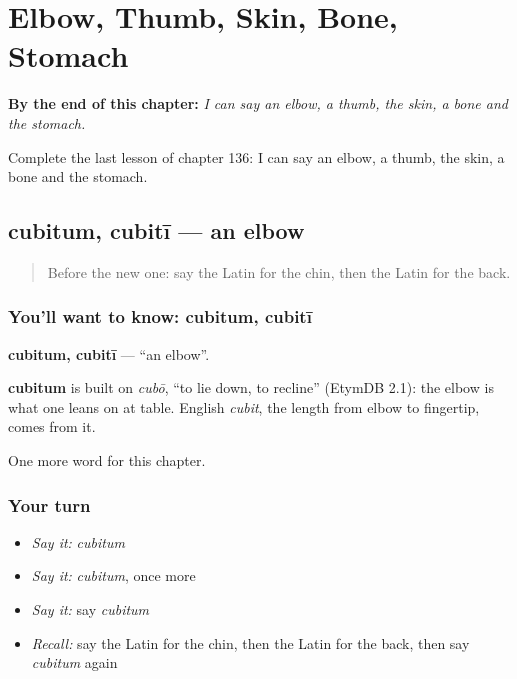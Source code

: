 
\chapter{Elbow, Thumb, Skin, Bone, Stomach}
\label{ch:la-elbow-thumb-skin-bone-stomach}

\begin{chapteropening}
\textbf{By the end of this chapter:} \emph{I can say an elbow, a thumb, the skin, a bone and the stomach.}

Complete the last lesson of chapter 136: I can say an elbow, a thumb, the skin, a bone and the stomach.
\end{chapteropening}

\section[cubitum, cubitī]{cubitum, cubitī — an elbow}

\label{lesson:LA-C136-cubitum}



\begin{quote}
Before the new one: say the Latin for the chin, then the Latin for the back.
\end{quote}

\subsection*{You'll want to know: cubitum, cubitī}
\textbf{cubitum, cubitī} — \textquotedblleft{}an elbow\textquotedblright{}.

\begin{cousinweb}
\textbf{cubitum} is built on \emph{cubō}, \textquotedblleft{}to lie down, to recline\textquotedblright{} (EtymDB 2.1): the elbow is what one leans on at table. English \emph{cubit}, the length from elbow to fingertip, comes from it.
\end{cousinweb}

\begin{grammarlens}[title={What you've built}]
One more word for this chapter.
\end{grammarlens}

\subsection*{Your turn}
\begin{itemize}
\raggedright
  \item \emph{Say it:} \emph{cubitum}
  \item \emph{Say it:} \emph{cubitum}, once more
  \item \emph{Say it:} say \emph{cubitum}
  \item \emph{Recall:} say the Latin for the chin, then the Latin for the back, then say \emph{cubitum} again
\end{itemize}

